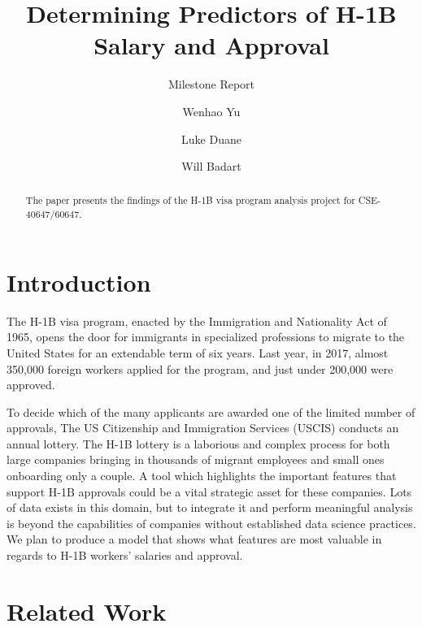 \documentclass[sigconf]{acmart}
\begin{document}
\title{Determining Predictors of H-1B Salary and Approval}
\subtitle{Milestone Report}


\author{Wenhao Yu}

\author{Luke Duane}

\author{Will Badart}


\begin{abstract}
The paper presents the findings of the H-1B visa program analysis project for CSE-40647/60647.
\end{abstract}

\maketitle


\section{Introduction}

The H-1B visa program, enacted by the Immigration and Nationality Act of 1965, opens the door for
immigrants in specialized professions to migrate to the United States for an extendable term of six
years. Last year, in 2017, almost 350,000 foreign workers applied for the program, and just under
200,000 were approved.

To decide which of the many applicants are awarded one of the limited number of approvals, The US
Citizenship and Immigration Services (USCIS) conducts an annual lottery.
The H-1B lottery is a laborious and complex process for both large companies bringing in
thousands of migrant employees and small ones onboarding only a couple. A tool which
highlights the important features that support H-1B approvals could be a vital strategic asset for
these companies. Lots of data exists in this domain, but to integrate it and perform meaningful
analysis is beyond the capabilities of companies without established data science practices.
We plan to produce a model that shows what features are most valuable in regards to H-1B
workers’ salaries and approval.


\section{Related Work}
\end{document}
